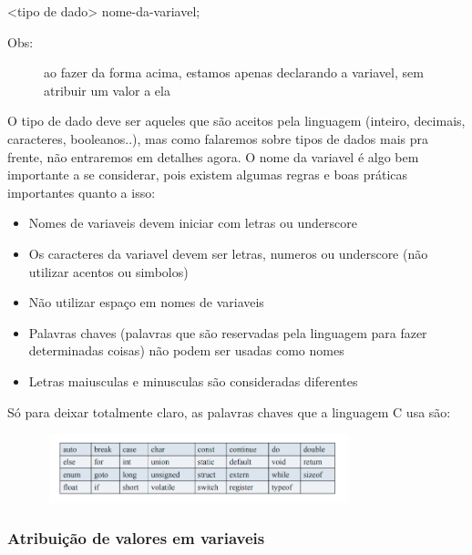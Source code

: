 \documentclass{report}
\begin{document}
    \begin{LARGE}
    	\begin{center}
    		<tipo de dado> nome-da-variavel;
    		
    	\end{center}
    \end{LARGE}

    \begin{description}
     	\item[Obs:] ao fazer da forma acima, estamos apenas declarando a variavel, sem atribuir um valor a ela
     \end{description}
    
    O tipo de dado deve ser aqueles que são aceitos pela linguagem (inteiro, decimais, caracteres, booleanos..), mas como falaremos sobre tipos de dados mais pra frente, não entraremos em detalhes agora. O nome da variavel é algo bem importante a se considerar, pois existem algumas regras e boas práticas importantes quanto a isso:
    \begin{itemize}
    	\item Nomes de variaveis devem iniciar com letras ou underscore 
    	\item Os caracteres da variavel devem ser letras, numeros ou underscore (não utilizar acentos ou simbolos)
    	\item Não utilizar espaço em nomes de variaveis
    	\item Palavras chaves (palavras que são reservadas pela linguagem para fazer determinadas coisas) não podem ser usadas como nomes 
    	\item Letras maiusculas e minusculas são consideradas diferentes
    \end{itemize}
    
    Só para deixar totalmente claro, as palavras chaves que a linguagem C usa são:
    
    \begin{figure}[ht]
    	\centering
    	\includegraphics[width=9cm,height=2cm,keepaspectratio=false]{imagens/reservadas.png}
  
    \end{figure}
    
    \subsubsection{Atribuição de valores em variaveis}
    
\end{document}
